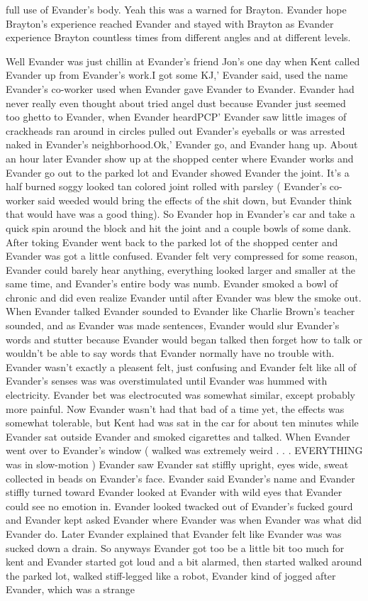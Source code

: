 \documentclass[12pt]{book}
\begin{document}
full use of Evander's body. Yeah this was a warned for Brayton. Evander hope Brayton's experience reached Evander and stayed with Brayton as Evander experience Brayton countless times from different angles and at different levels.



Well Evander was just chillin at Evander's friend Jon's one day when Kent called Evander up from Evander's work.I got some KJ,' Evander said, used the name Evander's co-worker used when Evander gave Evander to Evander. Evander had never really even thought about tried angel dust because Evander just seemed too ghetto to Evander, when Evander heardPCP' Evander saw little images of crackheads ran around in circles pulled out Evander's eyeballs or was arrested naked in Evander's neighborhood.Ok,' Evander go, and Evander hang up. About an hour later Evander show up at the shopped center where Evander works and Evander go out to the parked lot and Evander showed Evander the joint. It's a half burned soggy looked tan colored joint rolled with parsley ( Evander's co-worker said weeded would bring the effects of the shit down, but Evander think that would have was a good thing). So Evander hop in Evander's car and take a quick spin around the block and hit the joint and a couple bowls of some dank. After toking Evander went back to the parked lot of the shopped center and Evander was got a little confused. Evander felt very compressed for some reason, Evander could barely hear anything, everything looked larger and smaller at the same time, and Evander's entire body was numb. Evander smoked a bowl of chronic and did even realize Evander until after Evander was blew the smoke out. When Evander talked Evander sounded to Evander like Charlie Brown's teacher sounded, and as Evander was made sentences, Evander would slur Evander's words and stutter because Evander would began talked then forget how to talk or wouldn't be able to say words that Evander normally have no trouble with. Evander wasn't exactly a pleasent felt, just confusing and Evander felt like all of Evander's senses was was overstimulated until Evander was hummed with electricity. Evander bet was electrocuted was somewhat similar, except probably more painful. Now Evander wasn't had that bad of a time yet, the effects was somewhat tolerable, but Kent had was sat in the car for about ten minutes while Evander sat outside Evander and smoked cigarettes and talked. When Evander went over to Evander's window ( walked was extremely weird . . .  EVERYTHING was in slow-motion ) Evander saw Evander sat stiffly upright, eyes wide, sweat collected in beads on Evander's face. Evander said Evander's name and Evander stiffly turned toward Evander looked at Evander with wild eyes that Evander could see no emotion in. Evander looked twacked out of Evander's fucked gourd and Evander kept asked Evander where Evander was when Evander was what did Evander do. Later Evander explained that Evander felt like Evander was was sucked down a drain. So anyways Evander got too be a little bit too much for kent and Evander started got loud and a bit alarmed, then started walked around the parked lot, walked stiff-legged like a robot, Evander kind of jogged after Evander, which was a strange 
\end{document}
